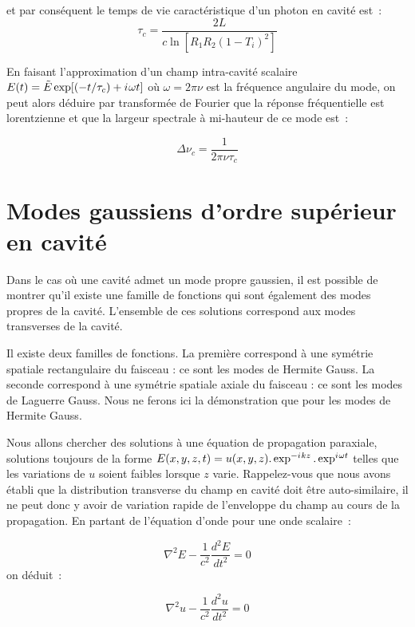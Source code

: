 \documentclass[a4paper]{book}
\newcommand{\iu}{{i\mkern1mu}}
\begin{document}
et par conséquent le temps de vie caractéristique d'un photon en cavité est~:
\begin{equation}
    \tau_c = \frac{2L}{c \ln[R_1R_2(1-T_i)^2]}
\end{equation}

En faisant l'approximation d'un champ intra-cavité scalaire $E(t) = \tilde E\exp[(-t/\tau_c)+\iu \omega t]$ où $\omega = 2\pi \nu$ est la fréquence angulaire du mode, on peut alors déduire par transformée de Fourier que la réponse fréquentielle est lorentzienne et que la largeur spectrale à mi-hauteur de ce mode est~:

\begin{equation}
    \Delta \nu_c = \frac{1}{2\pi\nu\tau_c}
\end{equation}


\section{Modes gaussiens d'ordre supérieur en cavité}


Dans le cas où une cavité admet un mode propre gaussien, il est possible de montrer qu'il existe une famille de fonctions qui sont également des modes propres de la cavité. L'ensemble de ces solutions correspond aux modes transverses de la cavité.

Il existe deux familles de fonctions. La première correspond à une symétrie spatiale rectangulaire du faisceau : ce sont les
modes de Hermite Gauss. La seconde correspond à une symétrie spatiale axiale du faisceau : ce sont les modes de Laguerre Gauss.
Nous ne ferons ici la démonstration que pour les modes de Hermite Gauss.

Nous allons chercher des solutions à une équation de propagation paraxiale, solutions toujours de la forme $E(x,y,z,t)=u(x,y,z).\exp^{-\iu kz}.\exp^{\iu \omega t}$ telles que les variations de $u$ soient faibles lorsque $z$ varie. Rappelez-vous que nous avons établi que la distribution transverse du champ en cavité doit être auto-similaire, il ne peut donc y avoir de variation rapide de l'enveloppe du champ au cours de la propagation. En partant de l'équation d'onde pour une onde scalaire~:

\begin{equation}
    \nabla^2E -\frac{1}{c^2}\frac{d^2E}{dt^2}=0
\end{equation}
on déduit~: 

\begin{equation}
    \nabla^2u -\frac{1}{c^2}\frac{d^2u}{dt^2}=0
\end{equation}
\end{document}
